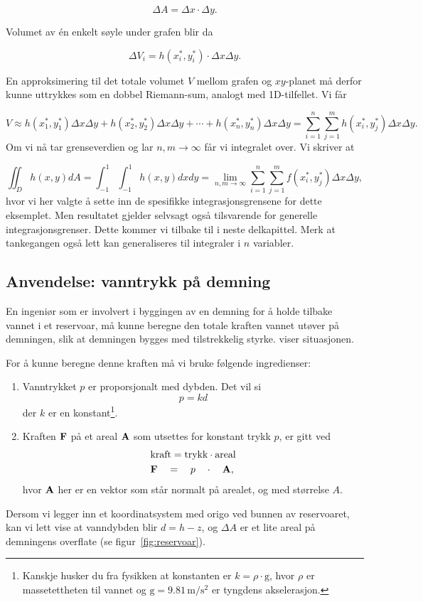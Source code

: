 \[\Delta A=\Delta x\cdot\Delta y.\]

Volumet av én enkelt søyle under grafen blir da

\[\Delta V_i= h(x_i^*,y_i^*)\cdot \Delta x\Delta y.\]

En approksimering til det totale volumet $V$ mellom grafen og $xy$-planet må derfor kunne uttrykkes som en dobbel Riemann-sum, analogt med 1D-tilfellet. Vi får

\[V\approx h(x_1^*,y_1^*) \Delta x \Delta y + h(x_2^*,y_2^*) \Delta x \Delta y + \cdots + h(x_n^*,y_n^*) \Delta x\Delta y = \sum_{i=1}^n\sum_{j=1}^m h(x_i^*,y_j^*)\Delta x\Delta y.\]
Om vi nå tar grenseverdien og lar $n,m\to \infty$ får vi integralet over. Vi skriver at

\[\iint_D h(x,y) dA=\int_{-1}^{1}\int_{-1}^1 h(x,y)dxdy = \lim_{n,m\to \infty}\sum_{i=1}^n\sum_{j=1}^m f(x_i^*,y_j^*)\Delta x\Delta y,\]
hvor vi her valgte å sette inn de spesifikke integrasjonsgrensene for dette eksemplet. Men resultatet gjelder selvsagt også tilsvarende for generelle integrasjonsgrenser. Dette kommer vi tilbake til i neste delkapittel. Merk at tankegangen også lett kan generaliseres til integraler i $n$ variabler.

\subsection*{Anvendelse: vanntrykk på demning}
En ingeniør som er involvert i byggingen av en demning for å holde tilbake vannet i et reservoar, må kunne beregne den totale kraften vannet utøver på demningen, slik at demningen bygges med tilstrekkelig styrke.
 viser situasjonen.

For å kunne beregne denne kraften må vi bruke følgende ingredienser:
\begin{enumerate}
  \item Vanntrykket \( p \) er proporsjonalt med dybden. Det vil si
  \begin{equation}
    p = kd \label{eq:pressure}
  \end{equation}
  der \( k \) er en konstant\footnote{Kanskje husker du fra fysikken at konstanten er $k=\rho\cdot\textrm{g}$, hvor $\rho$ er massetettheten til vannet og $\textrm{g}=9.81\,\textrm{m}/\textrm{s}^2$ er tyngdens akselerasjon.}.
  \item Kraften $\mathbf{F}$ på et areal $\mathbf{A}$ som utsettes for konstant trykk $p$, er gitt ved
  \begin{align}
&\text{kraft} =\text{trykk} \cdot \text{areal}\nonumber\\
&\mathbf{F}\quad=\quad p\quad\cdot\quad\mathbf{A},
\label{eq:kraftformel}
  \end{align}
  hvor $\mathbf{A}$ her er en vektor som står normalt på arealet, og med størrelse $A$.
\end{enumerate}
Dersom vi legger inn et koordinatsystem med origo ved bunnen av reservoaret, kan vi lett vise at vanndybden blir \( d=h-z \), og \( \Delta A \) er et lite areal på demningens overflate (se figur~\ref{fig:reservoar}).

